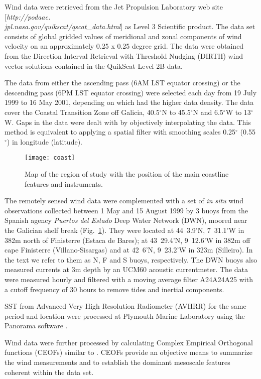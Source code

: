 Wind data were retrieved from the Jet Propulsion Laboratory web
site [{\it http://podaac.\\
jpl.nasa.gov/quikscat/qscat\_data.html}] as Level
3 Scientific product. The data set consists of global gridded
values of meridional and zonal components of wind velocity on an
approximately 0.25 x 0.25 degree grid. The data were obtained from
the Direction Interval Retrieval with Threshold Nudging (DIRTH)
wind vector solutions contained in the QuikScat Level 2B data.

The data from either the ascending pass (6AM LST equator crossing)
or the descending pass (6PM LST equator crossing) were selected
each day from 19 July 1999 to 16 May 2001, depending on which had
the higher data density. The data cover the Coastal Transition
Zone off Galicia, 40.5$^{\circ}$N to 45.5$^{\circ}$N and
6.5$^{\circ}$W to 13$^{\circ}$W. Gaps in the data were dealt with
by objectively interpolating the data. This method is equivalent
to applying a spatial filter with smoothing scales 0.25$^{\circ}$
(0.55$^{\circ}$) in longitude (latitude).

\begin{figure}
\texttt{[image: coast]}
\caption{Map of the region of study with the position of the main
coastline features and instruments. }\label{fig:ib}
\end{figure}

The remotely sensed wind data were complemented with a set of {\it
in situ} wind observations collected between 1 May and 15 August
1999 by 3 buoys from the Spanish agency {\it Puertos del Estado}
Deep Water Network (DWN), moored near the Galician shelf break
(Fig.~\ref{fig:ib}). They were located at 44\deg~3.9'N,
7\deg~31.1'W in 382m north of Finisterre (Estaca de Bares); at
43\deg~29.4'N, 9\deg~12.6'W in 382m off cape Finisterre
(Villano-Sisargas) and at 42\deg~6'N, 9\deg~23.2'W in 323m
(Silleiro). In the text we refer to them as N, F and S buoys,
respectively. The DWN buoys also measured currents at 3m depth by
an UCM60 acoustic currentmeter. The data were measured hourly and
filtered with a moving average filter A24A24A25 \citep{godin91}
with a cutoff frequency of 30 hours to remove tides and inertial
components.

SST from Advanced Very High Resolution Radiometer (AVHRR) for the
same period and location were processed at Plymouth Marine
Laboratory using the Panorama software \citep{miller97} .

Wind data were further processed by calculating Complex Empirical
Orthogonal functions (CEOFs) similar to \citet{munchow00}. CEOFs
provide an objective means to summarize the wind measurements and
to establish the dominant mesoscale features coherent within the
data set.

